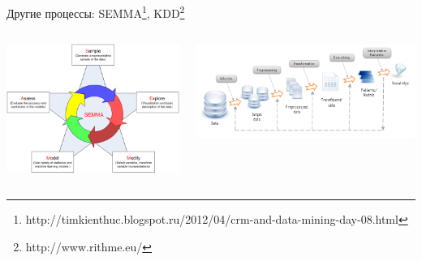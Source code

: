 \documentclass[aspectratio=169]{beamer}
\begin{document}
\begin{frame}{Другие процессы: SEMMA\footnote{http://timkienthuc.blogspot.ru/2012/04/crm-and-data-mining-day-08.html}, KDD\footnote{http://www.rithme.eu/}}

\begin{columns}
    \begin{column}{.5\textwidth}
    	\includegraphics[width=\textwidth]{images/semma.png}
    \end{column}
       
    \begin{column}{.5\textwidth}
    \vspace{-0em}
	\begin{center}
   		\includegraphics[width=\textwidth]{images/kdd.png}
    \end{center}
    \end{column}
  \end{columns}

\end{frame}

\end{document}
